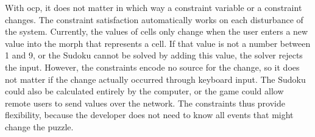 With \ac{ocp}, it does not matter in which way a constraint variable
or a constraint changes. The constraint satisfaction automatically
works on each disturbance of the system.  Currently, the values of
cells only change when the user enters a new value into the morph
that represents a cell. If that value is not a number between 1 and 9,
or the Sudoku cannot be solved by adding this value, the solver
rejects the input. However, the constraints encode no source for the
change, so it does not matter if the change actually occurred through
keyboard input. The Sudoku could also be calculated entirely by the
computer, or the game could allow remote users to send values over the
network. The constraints thus provide flexibility, because the
developer does not need to know all events that might change the
puzzle.


